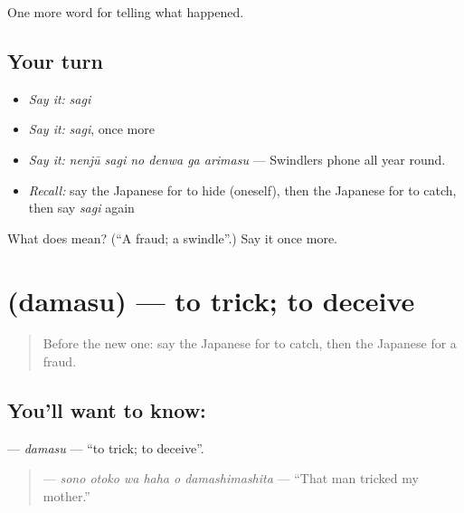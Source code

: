 \begin{grammarlens}[title={What you've built}]
One more word for telling what happened.
\end{grammarlens}

\subsection*{Your turn}
\begin{itemize}
\raggedright
  \item \emph{Say it:} \emph{sagi}
  \item \emph{Say it:} \emph{sagi}, once more
  \item \emph{Say it:} \emph{nenjū sagi no denwa ga arimasu} — Swindlers phone all year round.
  \item \emph{Recall:} say the Japanese for to hide (oneself), then the Japanese for to catch, then say \emph{sagi} again
\end{itemize}

\begin{tcolorbox}[breakable,colback=teal!4,colframe=teal!35!black,title={Before you move on}]
What does  mean? (\textquotedblleft{}A fraud; a swindle\textquotedblright{}.) Say it once more.
\end{tcolorbox}
\section[\texorpdfstring{\ja{だます} (damasu)}{だます (damasu)}]{ (damasu) — to trick; to deceive}

\label{lesson:JA-C272-damasu}



\begin{quote}
Before the new one: say the Japanese for to catch, then the Japanese for a fraud.
\end{quote}

\subsection*{You'll want to know: }
\textbf{} — \emph{damasu} — \textquotedblleft{}to trick; to deceive\textquotedblright{}.

\begin{quote}
\textbf{   } — \emph{sono otoko wa haha o damashimashita} — \textquotedblleft{}That man tricked my mother.\textquotedblright{}
\end{quote}


